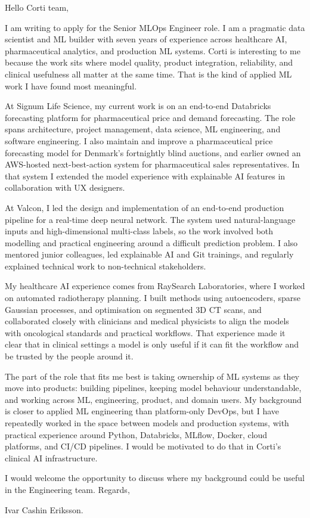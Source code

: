 \documentclass[11pt,a4paper]{moderncv}
\begin{document}
\makecvtitle
Hello Corti team,

\vspace*{2em}
I am writing to apply for the Senior MLOps Engineer role. I am a pragmatic data scientist and ML builder with seven years of experience across healthcare AI, pharmaceutical analytics, and production ML systems. Corti is interesting to me because the work sits where model quality, product integration, reliability, and clinical usefulness all matter at the same time. That is the kind of applied ML work I have found most meaningful.

\hspace*{2em}
At Signum Life Science, my current work is on an end-to-end Databricks forecasting platform for pharmaceutical price and demand forecasting. The role spans architecture, project management, data science, ML engineering, and software engineering. I also maintain and improve a pharmaceutical price forecasting model for Denmark's fortnightly blind auctions, and earlier owned an AWS-hosted next-best-action system for pharmaceutical sales representatives. In that system I extended the model experience with explainable AI features in collaboration with UX designers.

\hspace*{2em}
At Valcon, I led the design and implementation of an end-to-end production pipeline for a real-time deep neural network. The system used natural-language inputs and high-dimensional multi-class labels, so the work involved both modelling and practical engineering around a difficult prediction problem. I also mentored junior colleagues, led explainable AI and Git trainings, and regularly explained technical work to non-technical stakeholders.

\hspace*{2em}
My healthcare AI experience comes from RaySearch Laboratories, where I worked on automated radiotherapy planning. I built methods using autoencoders, sparse Gaussian processes, and optimisation on segmented 3D CT scans, and collaborated closely with clinicians and medical physicists to align the models with oncological standards and practical workflows. That experience made it clear that in clinical settings a model is only useful if it can fit the workflow and be trusted by the people around it.

\hspace*{2em}
The part of the role that fits me best is taking ownership of ML systems as they move into products: building pipelines, keeping model behaviour understandable, and working across ML, engineering, product, and domain users. My background is closer to applied ML engineering than platform-only DevOps, but I have repeatedly worked in the space between models and production systems, with practical experience around Python, Databricks, MLflow, Docker, cloud platforms, and CI/CD pipelines. I would be motivated to do that in Corti's clinical AI infrastructure.

\vspace*{2em}
I would welcome the opportunity to discuss where my background could be useful in the Engineering team. Regards,

\vspace*{1em}
Ivar Cashin Eriksson.
\end{document}
